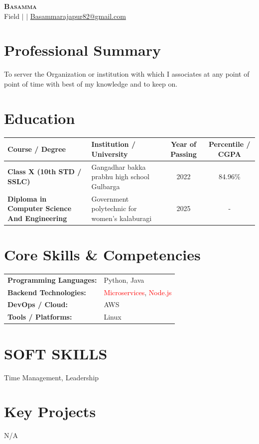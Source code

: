 \documentclass[10pt,a4paper]{article}
\begin{document}
\begin{center}
{\LARGE \textsc{\textbf{Basamma}}} \\ \vspace{3pt}
Field \quad $|$  \quad $|$ \quad \href{mailto:Basammarajapur82@gmail.com}{Basammarajapur82@gmail.com}
\end{center}

\section*{Professional Summary}
To server the Organization or institution with which I associates at any point of point of time with best of my knowledge and to keep on.

\section*{Education}
{\small
\renewcommand{\arraystretch}{1.18}
\noindent\begin{tabularx}{\textwidth}{|p{1.7in}|X|c|c|}
\hline
\textbf{Course / Degree} & \textbf{Institution / University} & \textbf{Year of Passing} & \textbf{Percentile / CGPA} \\ \hline
\textbf{Class X (10th STD / SSLC)} & Gangadhar bakka prabhu high school Gulbarga & 2022 & 84.96\% \\ \hline
\textbf{Diploma in Computer Science And Engineering} & Government polytechnic for women's kalaburagi & 2025 & - \\ \hline
\end{tabularx}
}\vspace{4pt}


\section*{Core Skills \& Competencies}
\begin{tabular}{@{}p{2.3in}p{4.5in}@{}}
\textbf{Programming Languages:} & Python, Java \\
\textbf{Backend Technologies:} & \textcolor{red}{Microservices}, \textcolor{red}{Node.js} \\
\textbf{DevOps / Cloud:} & AWS \\
\textbf{Tools / Platforms:} & Linux \\
\end{tabular}

\section*{SOFT SKILLS}
\noindent Time Management, Leadership \vspace{4pt}



\section*{Key Projects}
N/A


\end{document}
